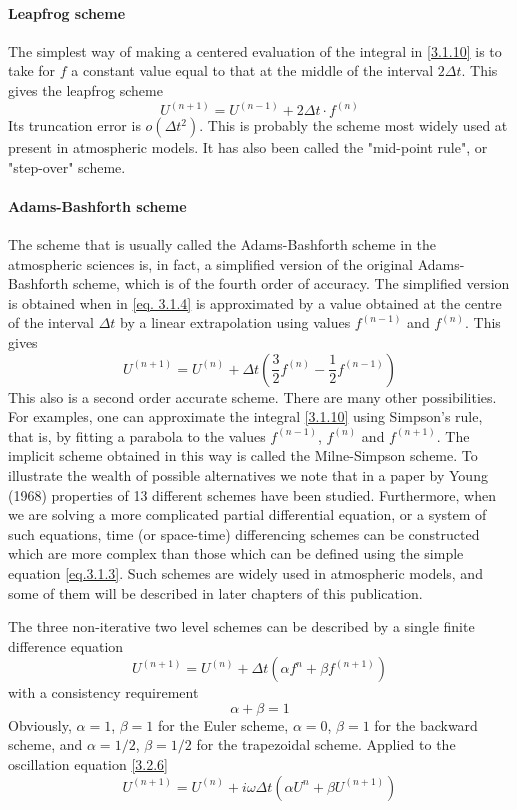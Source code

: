 \paragraph{Leapfrog scheme}
The simplest way of making a centered evaluation of the integral in \ref{3.1.10} is to take for $f$ a constant value equal to that at the middle of the interval $2\Delta t$. This gives the leapfrog scheme
\begin{equation}\label{3.1.11}
	U^{(n+1)}=U^{(n-1)}+2\Delta t\cdot f^{(n)}
\end{equation}
Its truncation error is $o(\Delta t^2)$. This is probably the scheme most widely used at present in atmospheric models. It has also been called the "mid-point rule", or "step-over" scheme.
\paragraph{Adams-Bashforth scheme}
The scheme that is usually called the Adams-Bashforth scheme in the atmospheric sciences is, in fact, a simplified version of the original Adams-Bashforth scheme, which is of the fourth order of accuracy. The simplified version is obtained when
in \ref{eq. 3.1.4} is approximated by a value obtained at the centre of the interval $\Delta t$ by a linear extrapolation using values $f^{(n-1)}$ and $f^{(n)}$. This gives
\begin{equation}\label{3.1.12}
	U^{(n+1)}=U^{(n)}+\Delta t\left(\frac{3}{2}f^{(n)}-\frac{1}{2}f^{(n-1)}\right)
\end{equation}
This also is a second order accurate scheme.
There are many other possibilities. For examples, one can approximate the integral \ref{3.1.10} using Simpson's rule, that is, by fitting a parabola to the values $f^{(n-1)}$, $f^{(n)}$ and $f^{(n+1)}$.
The implicit scheme obtained in this way is called the Milne-Simpson scheme. To illustrate the wealth of possible alternatives we note that in a paper by Young (1968) properties of 13 different schemes have been studied. Furthermore, when we are solving a more complicated partial differential equation, or a system of such equations, time (or space-time) differencing schemes can be constructed which are more complex than those which can be defined using the simple equation \ref{eq.3.1.3}. Such schemes are widely used in atmospheric models, and some of them will be described in later chapters of this publication.

The three non-iterative two level schemes can be described by a single finite difference equation
\begin{equation}\label{3.2.6}
	U^{(n+1)}=U^{(n)}+\Delta t\left(\alpha f^n+\beta f^{(n+1)}\right)
\end{equation}
with a consistency requirement
$$\alpha+\beta=1$$
Obviously, $\alpha=1$, $\beta=1$ for the Euler scheme, $\alpha=0$, $\beta=1$ for the backward scheme, and $\alpha=1/2$, $\beta=1/2$ for the trapezoidal scheme.
Applied to the oscillation equation \ref{3.2.6}
\begin{equation}\label{3.2.7}
	U^{(n+1)}=U^{(n)}+i\omega\Delta t\left(\alpha U^n+\beta U^{(n+1)}\right)
\end{equation}
